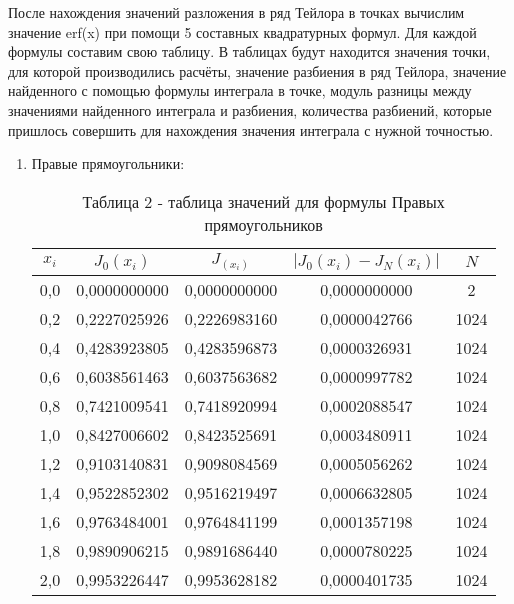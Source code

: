 \documentclass[14pt]{article}
\begin{document}
После нахождения значений разложения в ряд Тейлора в точках вычислим значение erf(x) при помощи 5 составных квадратурных формул. Для каждой формулы составим свою таблицу. В таблицах будут находится значения точки, для которой производились расчёты, значение разбиения в ряд Тейлора, значение найденного с помощью формулы интеграла в точке, модуль разницы между значениями найденного интеграла и разбиения, количества разбиений, которые пришлось совершить для нахождения значения интеграла с нужной точностью.
\begin{enumerate}[label = \arabic*.]
    \item {Правые прямоугольники:
        \begin{table}[h]
          \centering
          \begin{tabular}{|c|c|c|c|c|}
            \hline
            $x_i$ & $J_0(x_i)$ & $J_(x_i)$ & $\left|J_0(x_i) - J_N(x_i)\right|$ & $N$\\
            \hline
            0,0 & 0,0000000000 & 0,0000000000 & 0,0000000000 & 2\\
            \hline
            0,2 & 0,2227025926 & 0,2226983160 & 0,0000042766 & 1024\\
            \hline
            0,4 & 0,4283923805 & 0,4283596873 & 0,0000326931 & 1024\\
            \hline
            0,6 & 0,6038561463 & 0,6037563682 & 0,0000997782 & 1024\\
            \hline
            0,8 & 0,7421009541 & 0,7418920994 & 0,0002088547 & 1024\\
            \hline
            1,0 & 0,8427006602 & 0,8423525691 & 0,0003480911 & 1024\\
            \hline
            1,2 & 0,9103140831 & 0,9098084569 & 0,0005056262 & 1024\\
            \hline
            1,4 & 0,9522852302 & 0,9516219497 & 0,0006632805 & 1024\\
            \hline
            1,6 & 0,9763484001 & 0,9764841199 & 0,0001357198 & 1024\\
            \hline
            1,8 & 0,9890906215 & 0,9891686440 & 0,0000780225 & 1024\\
            \hline
            2,0 & 0,9953226447 & 0,9953628182 & 0,0000401735 & 1024\\
            \hline
          \end{tabular}
          \caption*{\small{Таблица 2 - таблица значений для формулы Правых прямоугольников}}
        \end{table}
}
\end{enumerate}
\end{document}
